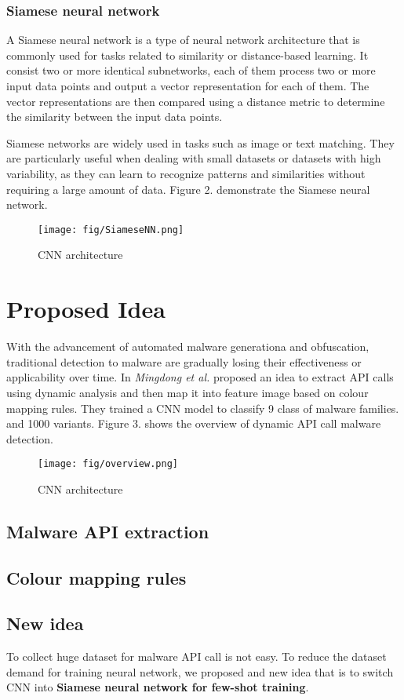 \documentclass{article}
\begin{document}
\subsubsection{Siamese neural network}
A Siamese neural network is a type of neural network architecture that is commonly used for tasks related to similarity or distance-based learning.
It consist two or more identical subnetworks, each of them process two or more input data points and output a vector representation for each of them. 
The vector representations are then compared using a distance metric to determine the similarity between the input data points.

Siamese networks are widely used in tasks such as image or text matching.
They are particularly useful when dealing with small datasets or datasets with high variability, 
as they can learn to recognize patterns and similarities without requiring a large amount of data.
Figure 2. demonstrate the Siamese neural network.
\begin{figure}
    \texttt{[image: fig/SiameseNN.png]}    
    \caption{CNN architecture}
\end{figure}
\section{Proposed Idea}
With the advancement of automated malware generationa and obfuscation, 
traditional detection to malware are gradually losing their effectiveness or applicability over time.
In \cite{ref2} \textit{Mingdong et al.} proposed an idea to extract API calls using dynamic analysis and then 
map it into feature image based on colour mapping rules. They trained a CNN model to classify 9 class of malware families.
and 1000 variants. Figure 3. shows the overview of dynamic API call malware detection.
\begin{figure}
    \texttt{[image: fig/overview.png]}    
    \caption{CNN architecture}
\end{figure}
\subsection{Malware API extraction}
\subsection{Colour mapping rules}
\subsection{New idea}
To collect huge dataset for malware API call is not easy. To reduce the dataset demand for training neural network, 
we proposed and new idea that is to switch CNN into \textbf{Siamese neural network for few-shot training}.
\end{document}
